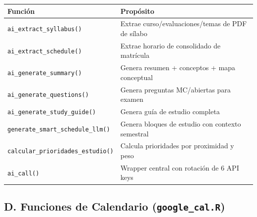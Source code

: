 \documentclass[
  spanish,
  11pt,
  a4paper,
]{article}
\newcounter{none} %
\begin{document}
{\def\LTcaptype{none} %
\begin{longtable}[]{@{}
  >{\raggedright\arraybackslash}p{}
  >{\raggedright\arraybackslash}p{}@{}}
\toprule\noalign{}
\begin{minipage}[b]{\linewidth}\raggedright
Función
\end{minipage} & \begin{minipage}[b]{\linewidth}\raggedright
Propósito
\end{minipage} \\
\midrule\noalign{}
\endhead
\bottomrule\noalign{}
\endlastfoot
\texttt{ai\_extract\_syllabus()} & Extrae curso/evaluaciones/temas de
PDF de sílabo \\
\texttt{ai\_extract\_schedule()} & Extrae horario de consolidado de
matrícula \\
\texttt{ai\_generate\_summary()} & Genera resumen + conceptos + mapa
conceptual \\
\texttt{ai\_generate\_questions()} & Genera preguntas MC/abiertas para
examen \\
\texttt{ai\_generate\_study\_guide()} & Genera guía de estudio
completa \\
\texttt{generate\_smart\_schedule\_llm()} & Genera bloques de estudio
con contexto semestral \\
\texttt{calcular\_prioridades\_estudio()} & Calcula prioridades por
proximidad y peso \\
\texttt{ai\_call()} & Wrapper central con rotación de 6 API keys \\
\end{longtable}
}

\subsection{\texorpdfstring{D. Funciones de Calendario
(\texttt{google\_cal.R})}{D. Funciones de Calendario (google\_cal.R)}}\label{d.-funciones-de-calendario-google_cal.r}
\end{document}
